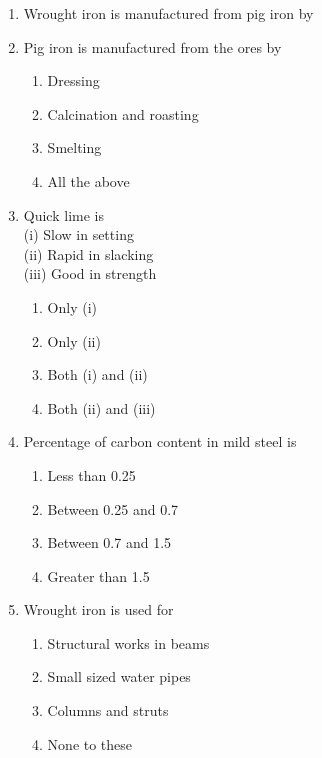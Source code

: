 \documentclass[11pt,a4paper]{article}
\begin{document}
\begin{enumerate}
\item{Wrought iron is manufactured from pig iron by}
\\
\item{Pig iron is manufactured from the ores by}
\begin{enumerate}[label=\Alph*.]
\item{Dressing}
\item{Calcination and roasting}
\item{Smelting}
\item{All the above}
\end{enumerate}
\item{Quick lime is \\
 (i) Slow in setting \\
 (ii) Rapid in slacking \\
 (iii) Good in strength}
\begin{enumerate}[label=\Alph*.]
\item{Only (i)}
\item{Only (ii)}
\item{Both (i) and (ii)}
\item{Both (ii) and (iii)}
\end{enumerate}
\item{Percentage of carbon content in mild steel is}
\begin{enumerate}[label=\Alph*.]
\item{Less than 0.25}
\item{Between 0.25 and 0.7}
\item{Between 0.7 and 1.5}
\item{Greater than 1.5}
\end{enumerate}
\item{Wrought iron is used for}
\begin{enumerate}[label=\Alph*.]
\item{Structural works in beams}
\item{Small sized water pipes}
\item{Columns and struts}
\item{None to these}

\end{enumerate}
\end{enumerate}
\end{document}
